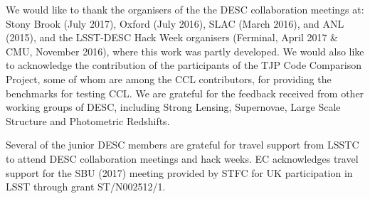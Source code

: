 % 
We would like to thank the organisers of the the DESC collaboration meetings at:
Stony Brook (July 2017), Oxford (July 2016), SLAC (March 2016), and ANL (2015), 
and the LSST-DESC Hack Week organisers (Ferminal, April 2017 \& CMU, November 2016), 
where this work was partly developed. We would also like to acknowledge the
contribution of the participants of the TJP Code Comparison Project, some of whom
are among the CCL contributors, for providing the benchmarks for 
testing CCL. We are grateful for the feedback received from
other working groups of DESC, including Strong Lensing, Supernovae, Large Scale
Structure and Photometric Redshifts.

Several of the junior DESC members are grateful for travel support from
LSSTC to attend DESC collaboration meetings and hack weeks.
EC acknowledges travel support for the SBU (2017) meeting 
provided by STFC for UK participation in LSST through grant ST/N002512/1.
% 
